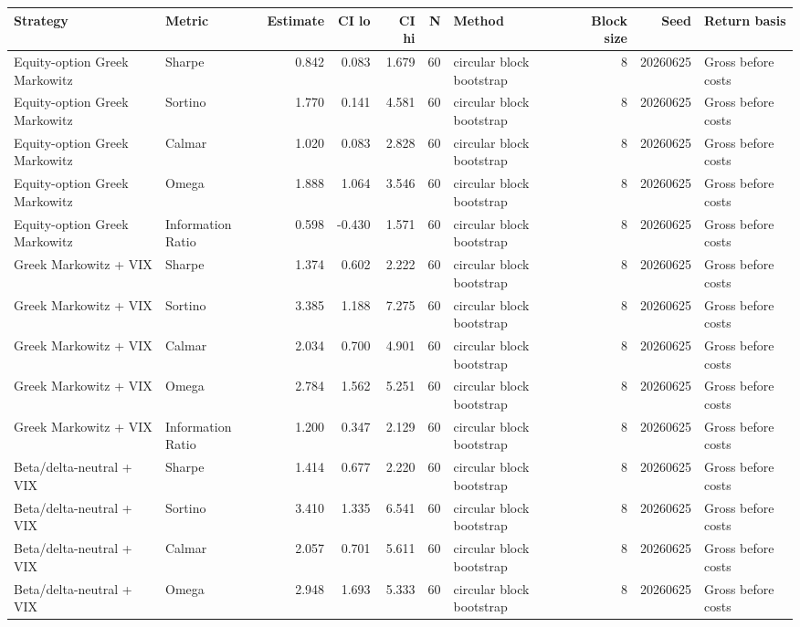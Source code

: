 \begin{tabular}{llrrrrlrrl}
\toprule
Strategy & Metric & Estimate & CI lo & CI hi & N & Method & Block size & Seed & Return basis \\
\midrule
Equity-option Greek Markowitz & Sharpe & 0.842 & 0.083 & 1.679 & 60 & circular block bootstrap & 8 & 20260625 & Gross before costs \\
Equity-option Greek Markowitz & Sortino & 1.770 & 0.141 & 4.581 & 60 & circular block bootstrap & 8 & 20260625 & Gross before costs \\
Equity-option Greek Markowitz & Calmar & 1.020 & 0.083 & 2.828 & 60 & circular block bootstrap & 8 & 20260625 & Gross before costs \\
Equity-option Greek Markowitz & Omega & 1.888 & 1.064 & 3.546 & 60 & circular block bootstrap & 8 & 20260625 & Gross before costs \\
Equity-option Greek Markowitz & Information Ratio & 0.598 & -0.430 & 1.571 & 60 & circular block bootstrap & 8 & 20260625 & Gross before costs \\
Greek Markowitz + VIX & Sharpe & 1.374 & 0.602 & 2.222 & 60 & circular block bootstrap & 8 & 20260625 & Gross before costs \\
Greek Markowitz + VIX & Sortino & 3.385 & 1.188 & 7.275 & 60 & circular block bootstrap & 8 & 20260625 & Gross before costs \\
Greek Markowitz + VIX & Calmar & 2.034 & 0.700 & 4.901 & 60 & circular block bootstrap & 8 & 20260625 & Gross before costs \\
Greek Markowitz + VIX & Omega & 2.784 & 1.562 & 5.251 & 60 & circular block bootstrap & 8 & 20260625 & Gross before costs \\
Greek Markowitz + VIX & Information Ratio & 1.200 & 0.347 & 2.129 & 60 & circular block bootstrap & 8 & 20260625 & Gross before costs \\
Beta/delta-neutral + VIX & Sharpe & 1.414 & 0.677 & 2.220 & 60 & circular block bootstrap & 8 & 20260625 & Gross before costs \\
Beta/delta-neutral + VIX & Sortino & 3.410 & 1.335 & 6.541 & 60 & circular block bootstrap & 8 & 20260625 & Gross before costs \\
Beta/delta-neutral + VIX & Calmar & 2.057 & 0.701 & 5.611 & 60 & circular block bootstrap & 8 & 20260625 & Gross before costs \\
Beta/delta-neutral + VIX & Omega & 2.948 & 1.693 & 5.333 & 60 & circular block bootstrap & 8 & 20260625 & Gross before costs \\

\end{tabular}
